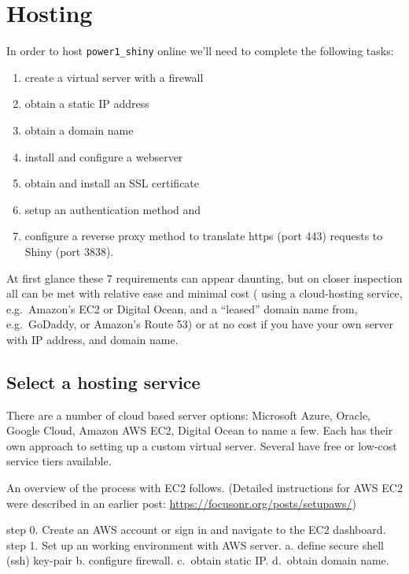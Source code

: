 \documentclass[
  letterpaper,
  DIV=11,
  numbers=noendperiod,
  oneside]{scrartcl}
\providecommand{\tightlist}{%
  \setlength{\itemsep}{0pt}\setlength{\parskip}{0pt}}\usepackage{longtable,booktabs,array}
\begin{document}
\hypertarget{hosting}{%
\section{Hosting}\label{hosting}}

In order to host \texttt{power1\_shiny} online we'll need to complete
the following tasks:

\begin{enumerate}
\def\labelenumi{\arabic{enumi}.}
\tightlist
\item
  create a virtual server with a firewall
\item
  obtain a static IP address
\item
  obtain a domain name
\item
  install and configure a webserver
\item
  obtain and install an SSL certificate
\item
  setup an authentication method and
\item
  configure a reverse proxy method to translate https (port 443)
  requests to Shiny (port 3838).
\end{enumerate}

At first glance these 7 requirements can appear daunting, but on closer
inspection all can be met with relative ease and minimal cost ( using a
cloud-hosting service, e.g.~Amazon's EC2 or Digital Ocean, and a
``leased'' domain name from, e.g.~GoDaddy, or Amazon's Route 53) or at
no cost if you have your own server with IP address, and domain name.

\hypertarget{select-a-hosting-service}{%
\subsection{Select a hosting service}\label{select-a-hosting-service}}

There are a number of cloud based server options: Microsoft Azure,
Oracle, Google Cloud, Amazon AWS EC2, Digital Ocean to name a few. Each
has their own approach to setting up a custom virtual server. Several
have free or low-cost service tiers available.

An overview of the process with EC2 follows. (Detailed instructions for
AWS EC2 were described in an earlier post:
\url{https://focusonr.org/posts/setupaws/})

step 0. Create an AWS account or sign in and navigate to the EC2
dashboard. step 1. Set up an working environment with AWS server. a.
define secure shell (ssh) key-pair b. configure firewall. c.~obtain
static IP. d.~obtain domain name.
\end{document}
